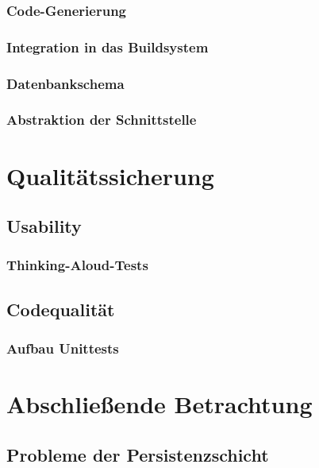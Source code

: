 \documentclass[a4paper,10pt]{article}
\begin{document}
\subsubsection{Code-Generierung}
\subsubsection{Integration in das Buildsystem}
\subsubsection{Datenbankschema}
\subsubsection{Abstraktion der Schnittstelle}

\section{Qualitätssicherung}
\subsection{Usability}
\subsubsection{Thinking-Aloud-Tests}
\subsection{Codequalität} 
\subsubsection{Aufbau Unittests}

\section{Abschließende Betrachtung}
\subsection{Probleme der Persistenzschicht}
\end{document}

